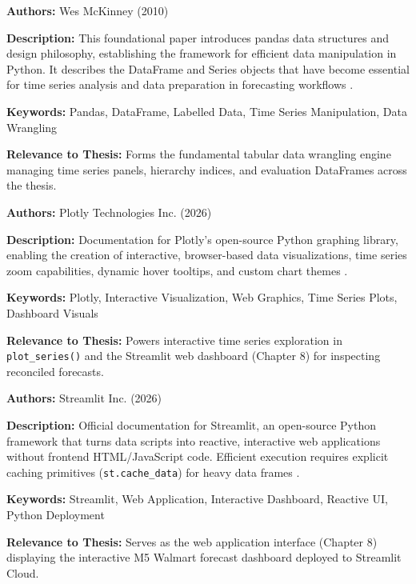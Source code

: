 {

	\textbf{Authors:}
	Wes McKinney (2010)

	\textbf{Description:}
	This foundational paper introduces pandas data structures and design philosophy, establishing the framework for efficient data manipulation in Python. It describes the DataFrame and Series objects that have become essential for time series analysis and data preparation in forecasting workflows \autocite{McKinney:2010}.

	\textbf{Keywords:}
	Pandas, DataFrame, Labelled Data, Time Series Manipulation, Data Wrangling

	\textbf{Relevance to Thesis:}
	Forms the fundamental tabular data wrangling engine managing time series panels, hierarchy indices, and evaluation DataFrames across the thesis.

}

{

	\textbf{Authors:}
	Plotly Technologies Inc. (2026)

	\textbf{Description:}
	Documentation for Plotly's open-source Python graphing library, enabling the creation of interactive, browser-based data visualizations, time series zoom capabilities, dynamic hover tooltips, and custom chart themes \autocite{Plotly:2026}.

	\textbf{Keywords:}
	Plotly, Interactive Visualization, Web Graphics, Time Series Plots, Dashboard Visuals

	\textbf{Relevance to Thesis:}
	Powers interactive time series exploration in \texttt{plot\_series()} and the Streamlit web dashboard (Chapter 8) for inspecting reconciled forecasts.

}

{

	\textbf{Authors:}
	Streamlit Inc. (2026)

	\textbf{Description:}
	Official documentation for Streamlit, an open-source Python framework that turns data scripts into reactive, interactive web applications without frontend HTML/JavaScript code. Efficient execution requires explicit caching primitives (\texttt{st.cache\_data}) for heavy data frames \autocite{Streamlit:2026}.

	\textbf{Keywords:}
	Streamlit, Web Application, Interactive Dashboard, Reactive UI, Python Deployment

	\textbf{Relevance to Thesis:}
	Serves as the web application interface (Chapter 8) displaying the interactive M5 Walmart forecast dashboard deployed to Streamlit Cloud.

}

